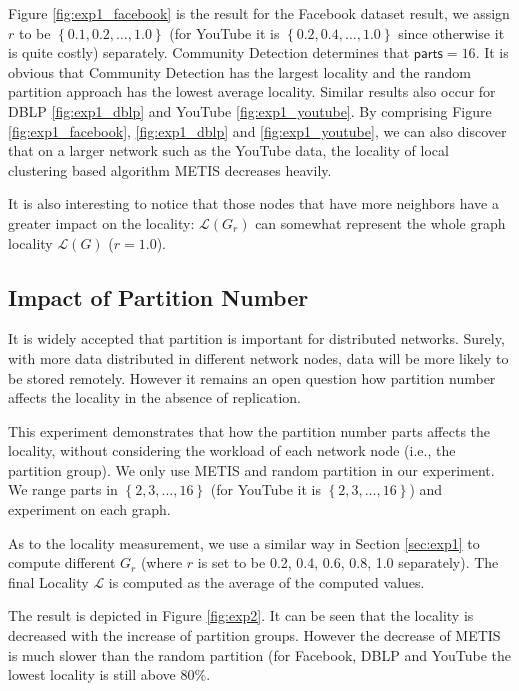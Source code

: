 Figure \ref{fig:exp1_facebook} is the result for the Facebook dataset result, we assign $r$ to be $\left\{0.1, 0.2, \ldots, 1.0\right\}$ (for YouTube it is $\left\{0.2, 0.4, \ldots, 1.0\right\}$ since otherwise it is quite costly) separately. Community Detection determines that $\textsf{parts}=16$. It is obvious that Community Detection has the largest locality and the random partition approach has the lowest average locality. Similar results also occur for DBLP \ref{fig:exp1_dblp} and YouTube \ref{fig:exp1_youtube}. By comprising Figure \ref{fig:exp1_facebook}, \ref{fig:exp1_dblp} and \ref{fig:exp1_youtube}, we can also discover that on a larger network such as the YouTube data, the locality of local clustering based algorithm METIS decreases heavily.

It is also interesting to notice that those nodes that have more neighbors have a greater impact on the locality: $\mathcal{L}(G_r)$ can somewhat represent the whole graph locality $\mathcal{L}(G)$ ($r=1.0$).

\subsection{Impact of Partition Number} \label{sec:exp2}

It is widely accepted that partition is important for distributed networks. Surely, with more data distributed in different network nodes, data will be more likely to be stored remotely. However it remains an open question how partition number affects the locality in the absence of replication.

This experiment demonstrates that how the partition number \textsf{parts} affects the locality, without considering the workload of each network node (i.e., the partition group). We only use METIS and random partition in our experiment. We range \textsf{parts} in $\left\{2, 3, \ldots, 16\right\}$ (for YouTube it is $\left\{2, 3, \ldots, 16\right\}$) and experiment on each graph.

As to the locality measurement, we use a similar way in Section \ref{sec:exp1} to compute different $G_r$ (where $r$ is set to be 0.2, 0.4, 0.6, 0.8, 1.0 separately). The final Locality $\mathcal{L}$ is computed as the average of the computed values.

The result is depicted in Figure \ref{fig:exp2}. It can be seen that the locality is decreased with the increase of partition groups. However the decrease of METIS is much slower than the random partition (for Facebook, DBLP and YouTube the lowest locality is still above $80\%$.

